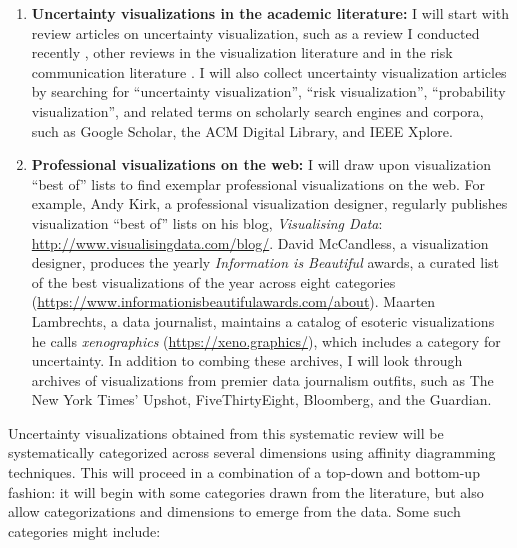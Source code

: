 \documentclass[11pt]{article}
\begin{document}
\vspace{-0.75em}
\begin{enumerate}[noitemsep]
  \item \textbf{Uncertainty visualizations in the academic literature:} I will start with review articles on uncertainty visualization, such as a review I conducted recently \cite{hullman2018pursuit}, other reviews in the visualization literature \cite{MacEachren1992,maceachren_visualizing_2005} and in the risk communication literature \cite{Ancker2006,Garcia-Retamero2013}. I will also collect uncertainty visualization articles by searching for ``uncertainty visualization'', ``risk visualization'', ``probability visualization'', and related terms on scholarly search engines and corpora, such as Google Scholar, the ACM Digital Library, and IEEE Xplore.
  
  \item \textbf{Professional visualizations on the web:} I will draw upon visualization ``best of'' lists to find exemplar professional visualizations on the web. For example, Andy Kirk, a professional visualization designer, regularly publishes visualization ``best of'' lists on his blog, \emph{Visualising Data}: \url{http://www.visualisingdata.com/blog/}. David McCandless, a visualization designer, produces the yearly \emph{Information is Beautiful} awards, a curated list of the best visualizations of the year across eight categories (\url{https://www.informationisbeautifulawards.com/about}). Maarten Lambrechts, a data journalist, maintains a catalog of esoteric visualizations he calls \emph{xenographics} (\url{https://xeno.graphics/}), which includes a category for uncertainty. In addition to combing these archives, I will look through archives of visualizations from premier data journalism outfits, such as The New York Times’ Upshot, FiveThirtyEight, Bloomberg, and the Guardian.
\end{enumerate}
  
Uncertainty visualizations obtained from this systematic review will be systematically categorized across several dimensions using affinity diagramming techniques. This will proceed in a combination of a top-down and bottom-up fashion: it will begin with some categories drawn from the literature, but also allow categorizations and dimensions to emerge from the data. Some such categories might include:
\end{document}
